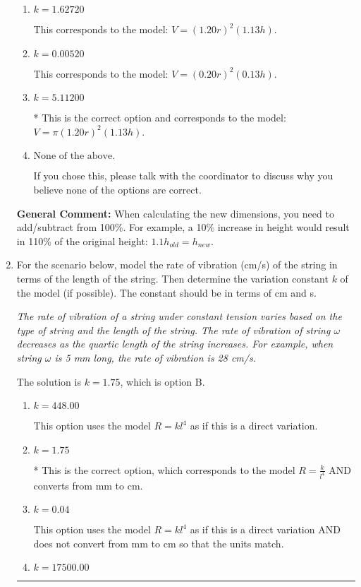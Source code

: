 \documentclass{extbook}[14pt]
\newcommand{\litem}[1]{\item #1

\rule{\textwidth}{0.4pt}}
\begin{document}
\begin{enumerate}
{\begin{enumerate}[label=\Alph*.]
This corresponds to the model: $V = \pi (0.20 r)^2 (0.13 h)$.
\item \( k = 1.62720 \)

This corresponds to the model: $V = (1.20 r)^2 (1.13 h)$.
\item \( k = 0.00520 \)

This corresponds to the model: $V = (0.20 r)^2 (0.13 h)$.
\item \( k = 5.11200 \)

* This is the correct option and corresponds to the model: $V = \pi (1.20 r)^2 (1.13 h)$.
\item \( \text{None of the above.} \)

If you chose this, please talk with the coordinator to discuss why you believe none of the options are correct.
\end{enumerate}

\textbf{General Comment:} When calculating the new dimensions, you need to add/subtract from 100\%. For example, a 10\% increase in height would result in 110\% of the original height: $1.1h_{old} = h_{new}$.
}
\litem{
For the scenario below, model the rate of vibration (cm/s) of the string in terms of the length of the string. Then determine the variation constant $k$ of the model (if possible). The constant should be in terms of cm and s.

\begin{center}
    \textit{ The rate of vibration of a string under constant tension varies based on the type of string and the length of the string. The rate of vibration of string $\omega$ decreases as the quartic length of the string increases. For example, when string $\omega$ is 5 mm long, the rate of vibration is 28 cm/s. }
\end{center}
The solution is \( k = 1.75 \), which is option B.\begin{enumerate}[label=\Alph*.]
\item \( k = 448.00 \)

This option uses the model $R = kl^{4}$ as if this is a direct variation.
\item \( k = 1.75 \)

* This is the correct option, which corresponds to the model $R = \frac{k}{l^{4}}$ AND converts from mm to cm.
\item \( k = 0.04 \)

This option uses the model $R = kl^{4}$ as if this is a direct variation AND does not convert from mm to cm so that the units match.
\item \( k = 17500.00 \)


\end{enumerate}}
\end{enumerate}
\end{document}
